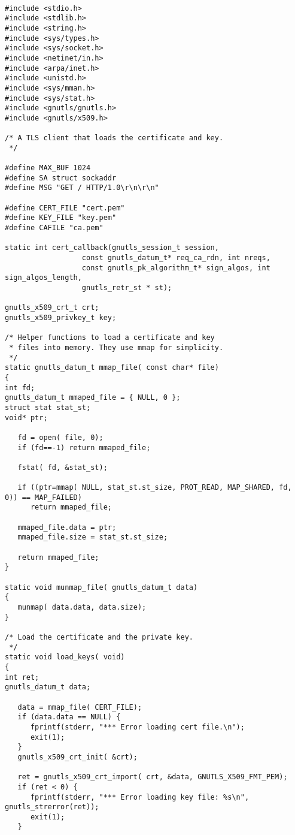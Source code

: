 \begin{verbatim}

#include <stdio.h>
#include <stdlib.h>
#include <string.h>
#include <sys/types.h>
#include <sys/socket.h>
#include <netinet/in.h>
#include <arpa/inet.h>
#include <unistd.h>
#include <sys/mman.h>
#include <sys/stat.h>
#include <gnutls/gnutls.h>
#include <gnutls/x509.h>

/* A TLS client that loads the certificate and key.
 */

#define MAX_BUF 1024
#define SA struct sockaddr
#define MSG "GET / HTTP/1.0\r\n\r\n"

#define CERT_FILE "cert.pem"
#define KEY_FILE "key.pem"
#define CAFILE "ca.pem"

static int cert_callback(gnutls_session_t session,
                  const gnutls_datum_t* req_ca_rdn, int nreqs,
                  const gnutls_pk_algorithm_t* sign_algos, int sign_algos_length,
                  gnutls_retr_st * st);

gnutls_x509_crt_t crt;
gnutls_x509_privkey_t key;

/* Helper functions to load a certificate and key
 * files into memory. They use mmap for simplicity.
 */
static gnutls_datum_t mmap_file( const char* file)
{
int fd;
gnutls_datum_t mmaped_file = { NULL, 0 };
struct stat stat_st;
void* ptr;

   fd = open( file, 0);
   if (fd==-1) return mmaped_file;
   
   fstat( fd, &stat_st);
   
   if ((ptr=mmap( NULL, stat_st.st_size, PROT_READ, MAP_SHARED, fd, 0)) == MAP_FAILED)
      return mmaped_file;
   
   mmaped_file.data = ptr;
   mmaped_file.size = stat_st.st_size;
   
   return mmaped_file;
}

static void munmap_file( gnutls_datum_t data)
{
   munmap( data.data, data.size);
}

/* Load the certificate and the private key.
 */
static void load_keys( void)
{
int ret;
gnutls_datum_t data;

   data = mmap_file( CERT_FILE);
   if (data.data == NULL) {
      fprintf(stderr, "*** Error loading cert file.\n");
      exit(1);
   }
   gnutls_x509_crt_init( &crt);
   
   ret = gnutls_x509_crt_import( crt, &data, GNUTLS_X509_FMT_PEM);
   if (ret < 0) {
      fprintf(stderr, "*** Error loading key file: %s\n", gnutls_strerror(ret));
      exit(1);
   }


\end{verbatim}
